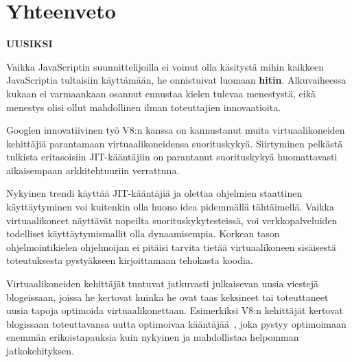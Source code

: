 \section{Yhteenveto}

\textbf{UUSIKSI}

Vaikka JavaScriptin suunnittelijoilla ei voinut olla käsitystä mihin kaikkeen JavaScriptia tultaisiin käyttämään, he onnistuivat luomaan \textbf{hitin}. Alkuvaiheessa kukaan ei varmaankaan osannut ennustaa kielen tulevaa menestystä, eikä menestys olisi ollut mahdollinen ilman toteuttajien innovaatioita.

Googlen innovatiivinen työ V8:n kanssa on kannustanut muita virtuaalikoneiden kehittäjiä parantamaan virtuaalikoneidensa suorituskykyä. Siirtyminen pelkästä tulkista eritasoisiin JIT-kääntäjiin on parantanut suorituskykyä huomattavasti aikaisempaan arkkitehtuuriin verrattuna.

Nykyinen trendi käyttää JIT-kääntäjiä ja olettaa ohjelmien staattinen käyttäytyminen voi kuitenkin olla huono idea pidemmällä tähtäimellä. Vaikka virtuaalikoneet näyttävät nopeilta suorituskykytesteissä, voi verkkopalveluiden todelliset käyttäytymismallit olla dynaamisempia. Korkean tason ohjelmointikielen ohjelmoijan ei pitäisi tarvita tietää virtuaalikoneen sisäisestä toteutuksesta pystyäkseen kirjoittamaan tehokasta koodia.

Virtuaalikoneiden kehittäjät tuntuvat jatkuvasti julkaisevan uusia viestejä blogeissaan, joissa he kertovat kuinka he ovat taas keksineet tai toteuttaneet uusia tapoja optimoida virtuaalikonettaan. Esimerkiksi V8:n kehittäjät kertovat blogissaan toteuttavansa uutta optimoivaa kääntäjää~\cite{turbofan}, joka pystyy optimoimaan enemmän erikoistapauksia kuin nykyinen ja mahdollistaa helpomman jatkokehityksen.

